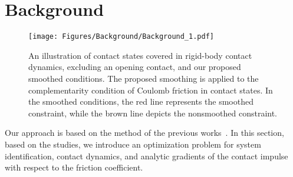 \section{Background} \label{Sec:Background}
\begin{figure}
    \centering
    \texttt{[image: Figures/Background/Background\_1.pdf]}
    \caption{An illustration of contact states covered in rigid-body contact dynamics, excluding an opening contact, and our proposed smoothed conditions. The proposed smoothing is applied to the complementarity condition of Coulomb friction in contact states. In the smoothed conditions, the red line represents the smoothed constraint, while the brown line depicts the nonsmoothed constraint.}
    \label{figure:contact_dynamics}
\end{figure}
Our approach is based on the method of the previous works~\cite{raisim,werling2021fast,kim2022contact,chen2022real}. In this section, based on the studies, we introduce an optimization problem for system identification, contact dynamics, and analytic gradients of the contact impulse with respect to the friction coefficient. 

